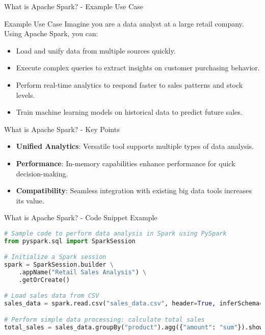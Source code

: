 \documentclass[aspectratio=169]{beamer}
\begin{document}
\begin{frame}[fragile]{What is Apache Spark? - Example Use Case}
    \begin{block}{Example Use Case}
        Imagine you are a data analyst at a large retail company. Using Apache Spark, you can:
        
        \begin{itemize}
            \item Load and unify data from multiple sources quickly.
            \item Execute complex queries to extract insights on customer purchasing behavior.
            \item Perform real-time analytics to respond faster to sales patterns and stock levels.
            \item Train machine learning models on historical data to predict future sales.
        \end{itemize}
    \end{block}
\end{frame}

\begin{frame}[fragile]{What is Apache Spark? - Key Points}
    \begin{itemize}
        \item \textbf{Unified Analytics}: Versatile tool supports multiple types of data analysis.
        
        \item \textbf{Performance}: In-memory capabilities enhance performance for quick decision-making.
        
        \item \textbf{Compatibility}: Seamless integration with existing big data tools increases its value.
    \end{itemize}
\end{frame}

\begin{frame}[fragile]{What is Apache Spark? - Code Snippet Example}
    \begin{lstlisting}[language=Python]
# Sample code to perform data analysis in Spark using PySpark
from pyspark.sql import SparkSession

# Initialize a Spark session
spark = SparkSession.builder \
    .appName("Retail Sales Analysis") \
    .getOrCreate()

# Load sales data from CSV
sales_data = spark.read.csv("sales_data.csv", header=True, inferSchema=True)

# Perform simple data processing: calculate total sales
total_sales = sales_data.groupBy("product").agg({"amount": "sum"}).show()
    \end{lstlisting}
\end{frame}
\end{document}
